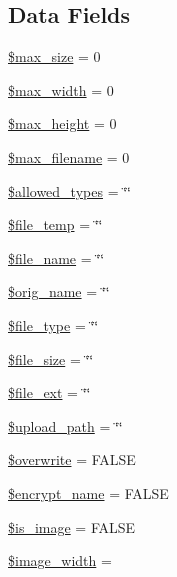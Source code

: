 \subsection*{Data Fields}
\begin{DoxyCompactItemize}
\item 
\hyperlink{class_c_i___upload_a3fec414be9f76cb7ba77ed79b784de62}{\$max\+\_\+size} = 0
\item 
\hyperlink{class_c_i___upload_a7f6a5db40a5fd00c8babbd37480b00fc}{\$max\+\_\+width} = 0
\item 
\hyperlink{class_c_i___upload_a7f2b56fde8cdd8907f9228149fc4b9bc}{\$max\+\_\+height} = 0
\item 
\hyperlink{class_c_i___upload_a7c8c80e453111c2521e355b83331a9df}{\$max\+\_\+filename} = 0
\item 
\hyperlink{class_c_i___upload_a2e0df9e15179e2db66d161206842d6c0}{\$allowed\+\_\+types} = \char`\"{}\char`\"{}
\item 
\hyperlink{class_c_i___upload_a8b49917820e40f0b8956d95c1fd6ee6e}{\$file\+\_\+temp} = \char`\"{}\char`\"{}
\item 
\hyperlink{class_c_i___upload_a59bf132c77b5bee5adff2098cc2a6fbc}{\$file\+\_\+name} = \char`\"{}\char`\"{}
\item 
\hyperlink{class_c_i___upload_a2704f7723b97b03285de219442ae3e2b}{\$orig\+\_\+name} = \char`\"{}\char`\"{}
\item 
\hyperlink{class_c_i___upload_a6210dfa92a7e2e5e9db1aa2337ce4cd1}{\$file\+\_\+type} = \char`\"{}\char`\"{}
\item 
\hyperlink{class_c_i___upload_a5b3595a69dbf686d879bd009ec9c0317}{\$file\+\_\+size} = \char`\"{}\char`\"{}
\item 
\hyperlink{class_c_i___upload_a65b080519869bc14d792c1800e3362f5}{\$file\+\_\+ext} = \char`\"{}\char`\"{}
\item 
\hyperlink{class_c_i___upload_a38507bf82f955d4b13642a3c7fd6e773}{\$upload\+\_\+path} = \char`\"{}\char`\"{}
\item 
\hyperlink{class_c_i___upload_a8d31b0ad9cccde7e2d857097672ed6cf}{\$overwrite} = F\+A\+L\+SE
\item 
\hyperlink{class_c_i___upload_a54a751add0762edd4da11373e3b56687}{\$encrypt\+\_\+name} = F\+A\+L\+SE
\item 
\hyperlink{class_c_i___upload_a4dae8ae20ed5fdf406554e1911065753}{\$is\+\_\+image} = F\+A\+L\+SE
\item 
\hyperlink{class_c_i___upload_a8dadc2d2dcc0f25529a2d1e080d08169}{\$image\+\_\+width} = \textquotesingle{}\textquotesingle{}

\end{DoxyCompactItemize}
